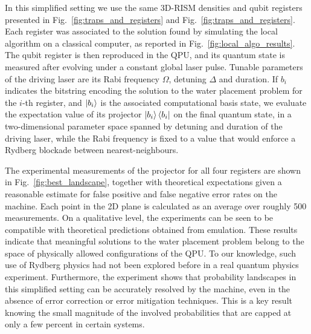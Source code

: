 \documentclass[fleqn,10pt]{wlscirep}
\begin{document}
In this simplified setting we use the same 3D-RISM densities and qubit registers presented in Fig.~\ref{fig:traps_and_registers} and Fig.~\ref{fig:traps_and_registers}. Each register was associated to the solution found by simulating the local algorithm on a classical computer, as reported in Fig.~\ref{fig:local_algo_results}. The qubit register is then reproduced in the QPU, and its quantum state is measured after evolving under a constant global laser pulse. Tunable parameters of the driving laser are its Rabi frequency $\Omega$, detuning $\Delta$ and duration. If $b_i$ indicates the bitstring encoding the solution to the water placement problem for the $i$-th register, and $\ket{b_i}$ is the associated computational basis state, we evaluate the expectation value of its projector $\ket{b_i}\bra{b_i}$ on the final quantum state, in a two-dimensional parameter space spanned by detuning and duration of the driving laser, while the Rabi frequency is fixed to a value that would enforce a Rydberg blockade between nearest-neighbours.

The experimental measurements of the projector for all four registers are shown in Fig.~\ref{fig:best_landscape}, together with theoretical expectations given a reasonable estimate for false positive and false negative error rates on the machine. Each point in the 2D plane is calculated as an average over roughly 500 measurements. On a qualitative level, the experiments can be seen to be compatible with theoretical predictions obtained from emulation. These results indicate that meaningful solutions to the water placement problem belong to the space of physically allowed configurations of the QPU. To our knowledge, such use of Rydberg physics had not been explored before in a real quantum physics experiment. Furthermore, the experiment shows that probability landscapes in this simplified setting can be accurately resolved by the machine, even in the absence of error correction or error mitigation techniques. This is a key result knowing the small magnitude of the involved probabilities that are capped at only a few percent in certain systems.
\end{document}
